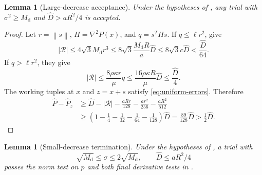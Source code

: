 \documentclass[11pt]{article}
\numberwithin{equation}{section}
\newtheorem{lemma}[assumption]{Lemma}
\newcommand{\norm}[1]{\left\lVert#1\right\rVert}
\newcommand{\Md}{M_{\mathrm d}}
\begin{document}
\begin{lemma}[Large-decrease acceptance]\label{lem:acceptance}
Under the hypotheses of , any trial with
$\sigma^2\ge\Md$ and $\widehat D>aR^2/4$ is accepted.
\end{lemma}

\begin{proof}
Let $r=\norm s$, $H=\nabla^2P(x)$, and $q=s^THs$.
If $q\le\ell r^2$,  give
\[
 |\mathcal R|
 \le4\sqrt3\Md r^3
 \le8\sqrt3\frac{\Md R}{a}\widehat D
 \le8\sqrt3c\widehat D<\frac{\widehat D}{64}.
\]
If $q>\ell r^2$, they give
\[
 |\mathcal R|\le\frac{8\rho\kappa r}{\mu}q
 \le\frac{16\rho\kappa R}{\mu}\widehat D
 \le\frac{\widehat D}{4}.
\]
The working tuples at $x$ and $z=x+s$ satisfy
\eqref{eq:uniform-errors}. Therefore
\[
\begin{aligned}
 \widehat P-\widehat P_z
 &\ge\widehat D-|\mathcal R|
       -\frac{aRr}{128}-\frac{ar^2}{256}
       -\frac{aR^2}{512}\\
 &\ge\left(1-\frac14-\frac1{32}-\frac1{64}-\frac1{128}\right)
           \widehat D
 =\frac{89}{128}\widehat D>\frac12\widehat D.
\end{aligned}
\]
\end{proof}

\begin{lemma}[Small-decrease termination]\label{lem:termination}
Under the hypotheses of , a trial with
\[
 \sqrt{\Md}\le\sigma\le2\sqrt{\Md},
 \qquad \widehat D\le aR^2/4
\]
passes the norm test on $p$ and both final derivative tests in
.
\end{lemma}
\end{document}
